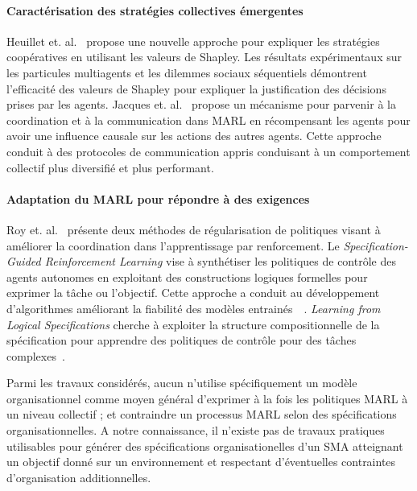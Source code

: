 \documentclass[demonstration]{jfsma}
\begin{document}
\paragraph{\textbf{Caractérisation des stratégies collectives émergentes}}
%
Heuillet et. al.~\cite{Heuillet2022} propose une nouvelle approche pour expliquer les stratégies coopératives en utilisant les valeurs de Shapley. Les résultats expérimentaux sur les particules multiagents et les dilemmes sociaux séquentiels démontrent l'efficacité des valeurs de Shapley pour expliquer la justification des décisions prises par les agents.
%
Jacques et. al.~\cite{Jaques2019} propose un mécanisme pour parvenir à la coordination et à la communication dans MARL en récompensant les agents pour avoir une influence causale sur les actions des autres agents. Cette approche conduit à des protocoles de communication appris conduisant à un comportement collectif plus diversifié et plus performant.

\paragraph{\textbf{Adaptation du MARL pour répondre à des exigences}}
%
%
Roy et. al.~\cite{Roy2020} présente deux méthodes de régularisation de politiques visant à améliorer la coordination dans l’apprentissage par renforcement.
%
Le \emph{Specification-Guided Reinforcement Learning} vise à synthétiser les politiques de contrôle des agents autonomes en exploitant des constructions logiques formelles pour exprimer la tâche ou l'objectif. Cette approche a conduit au développement d'algorithmes améliorant la fiabilité des modèles entrainés~\cite{Bansal2022}~\cite{Jothimurugan2023}.
%
\emph{Learning from Logical Specifications} cherche à exploiter la structure compositionnelle de la spécification pour apprendre des politiques de contrôle pour des tâches complexes~\cite{Jothimurugan2021}.

Parmi les travaux considérés, aucun n'utilise spécifiquement un modèle organisationnel comme moyen général d'exprimer à la fois les politiques MARL à un niveau collectif ; et contraindre un processus MARL selon des spécifications organisationnelles. A notre connaissance, il n'existe pas de travaux pratiques utilisables pour générer des spécifications organisationelles d'un SMA atteignant un objectif donné sur un environnement et respectant d'éventuelles contraintes d'organisation additionnelles.
\end{document}
